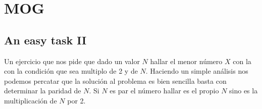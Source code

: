 \section{MOG}

\subsection{An easy task II} Un ejercicio que nos pide que dado un valor $N$ hallar el menor número $X$ con la con la condición que sea multiplo de 2 y de $N$. Haciendo un simple análisis nos podemos percatar que la solución al problema es bien sencilla basta con determinar la paridad de $N$. Si $N$ es par el número hallar es el propio $N$ sino es la multiplicación de $N$ por 2.